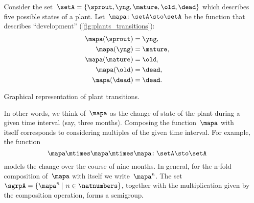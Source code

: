 \begin{example}
	\label{exa:plant-trafo-semigroup}
	Consider the set~$\setA = \{ \sprout, \yng, \mature, \old, \dead \}$ which describes five possible states of a plant.
	Let~$\mapa \colon \setA \sto \setA$ be the function that describes ``development'' (\cref{fig:plants_transitions}):
	\begin{align*}
		\mapa(\sprout) & =  \yng,    \\
		\mapa(\yng)    & =  \mature, \\
		\mapa(\mature) & =  \old,    \\
		\mapa( \old)   & = \dead,    \\
		\mapa (\dead)  & = \dead.
	\end{align*}
	\begin{marginfigure}
		\caption{Graphical representation of plant transitions.}
		\label{fig:plants_transitions}
	\end{marginfigure}
	In other words, we think of~$\mapa$ as the change of state of the plant during a given time interval (say, three months).
	Composing the function~$\mapa$ with itself corresponds to considering multiples of the given time interval.
	For example, the function
	\begin{equation*}
		\mapa \mtimes \mapa \mtimes \mapa \colon \setA \sto \setA
	\end{equation*}
	models the change over the course of nine months.
	In general, for the n-fold composition of~$\mapa$ with itself we write~$\mapa^n$.
	The set~$\sgrpA = \{ \mapa^n \mid n \in \natnumbers \}$, together with the multiplication given by the composition operation, forms a semigroup.
\end{example}

